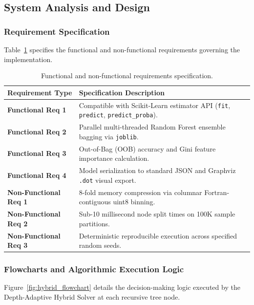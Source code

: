 \documentclass{article}
\begin{document}
	\subsection{System Analysis and Design}
	\subsubsection{Requirement Specification}
	Table~\ref{tab:requirements} specifies the functional and non-functional requirements governing the implementation.

	\begin{table}[htbp]
		\centering
		\small
		\caption{Functional and non-functional requirements specification.}
		\label{tab:requirements}
		\begin{tabularx}{\textwidth}{p{}X}
			\toprule
			\textbf{Requirement Type} & \textbf{Specification Description} \\
			\midrule
			\textbf{Functional Req 1} & Compatible with Scikit-Learn estimator API (\texttt{fit}, \texttt{predict}, \texttt{predict\_proba}). \\
			\textbf{Functional Req 2} & Parallel multi-threaded Random Forest ensemble bagging via \texttt{joblib}. \\
			\textbf{Functional Req 3} & Out-of-Bag (OOB) accuracy and Gini feature importance calculation. \\
			\textbf{Functional Req 4} & Model serialization to standard JSON and Graphviz \texttt{.dot} visual export. \\
			\midrule
			\textbf{Non-Functional Req 1} & 8-fold memory compression via columnar Fortran-contiguous uint8 binning. \\
			\textbf{Non-Functional Req 2} & Sub-10 millisecond node split times on 100K sample partitions. \\
			\textbf{Non-Functional Req 3} & Deterministic reproducible execution across specified random seeds. \\
			\bottomrule
		\end{tabularx}
	\end{table}

	\subsubsection{Flowcharts and Algorithmic Execution Logic}
	Figure~\ref{fig:hybrid_flowchart} details the decision-making logic executed by the Depth-Adaptive Hybrid Solver at each recursive tree node.
\end{document}

